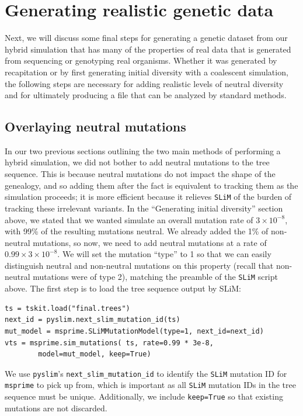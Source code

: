\documentclass[12pt]{article}
\newcommand{\msprime}[0]{\texttt{msprime}\xspace}
\newcommand{\slim}[0]{\texttt{SLiM}\xspace}
\newcommand{\pyslim}[0]{\texttt{pyslim}\xspace}
\begin{document}
\section{Generating realistic genetic data}

Next, we will discuss some final steps for generating a genetic dataset from our hybrid simulation that has many of the properties of real data that is generated from
sequencing or genotyping real organisms. Whether it was generated by recapitation or by first generating initial
diversity with a coalescent simulation, the following steps are necessary for adding realistic levels of neutral diversity and for ultimately producing a
file that can be analyzed by standard methods.

\subsection*{Overlaying neutral mutations}
In our two previous sections outlining the two main methods of performing a hybrid simulation, we did not bother to add neutral mutations to the tree sequence.
This is because neutral mutations do not impact the shape of the genealogy, and so adding them after the fact is equivalent to tracking them as the
simulation proceeds;
it is more efficient because it relieves \slim of the burden of tracking these irrelevant variants.
In the ``Generating initial diversity'' section above, we stated that we wanted simulate an overall mutation rate of $3 \times 10^{-8}$,
with 99\% of the resulting mutations neutral.
We already added the 1\% of non-neutral mutations, so now, we need to add neutral mutations at a rate of $0.99 \times 3 \times10^{-8}$.
We will set the mutation ``type'' to 1 so that we can easily distinguish neutral and non-neutral
mutations on this property (recall that non-neutral mutations were of type 2),
matching the preamble of the \slim script above.
The first step is to load the tree sequence output by SLiM:
\begin{verbatim}
ts = tskit.load("final.trees")
next_id = pyslim.next_slim_mutation_id(ts)
mut_model = msprime.SLiMMutationModel(type=1, next_id=next_id)
vts = msprime.sim_mutations( ts, rate=0.99 * 3e-8,
        model=mut_model, keep=True)
\end{verbatim}
We use \pyslim's \verb|next_slim_mutation_id| to identify the \slim mutation ID for \msprime to pick up from,
which is important as all \slim mutation IDs in the tree sequence must be unique.
Additionally, we include \verb|keep=True| so that existing mutations are not discarded.
\end{document}
